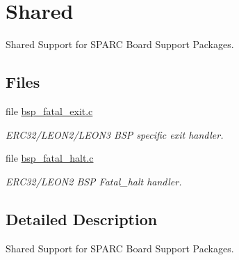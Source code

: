 \hypertarget{group__RTEMSBSPsSPARCShared}{}\section{Shared}
\label{group__RTEMSBSPsSPARCShared}


Shared Support for S\+P\+A\+RC Board Support Packages.  


\subsection*{Files}
\begin{DoxyCompactItemize}
\item 
file \mbox{\hyperlink{bsp__fatal__exit_8c}{bsp\+\_\+fatal\+\_\+exit.\+c}}
\begin{DoxyCompactList}\small\item\em E\+R\+C32/\+L\+E\+O\+N2/\+L\+E\+O\+N3 B\+SP specific exit handler. \end{DoxyCompactList}\item 
file \mbox{\hyperlink{sparc_2shared_2start_2bsp__fatal__halt_8c}{bsp\+\_\+fatal\+\_\+halt.\+c}}
\begin{DoxyCompactList}\small\item\em E\+R\+C32/\+L\+E\+O\+N2 B\+SP Fatal\+\_\+halt handler. \end{DoxyCompactList}\end{DoxyCompactItemize}


\subsection{Detailed Description}
Shared Support for S\+P\+A\+RC Board Support Packages. 

